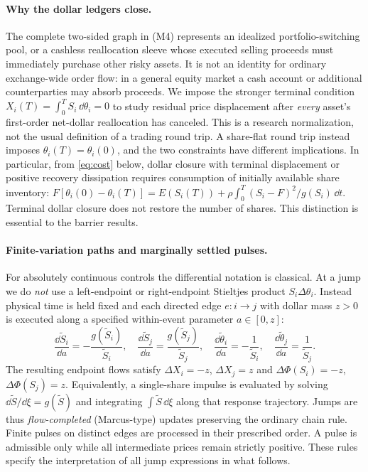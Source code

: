 \documentclass[review,hidelinks,onefignum,onetabnum]{siamonline250211}
\begin{document}
\paragraph{Why the dollar ledgers close.}
The complete two-sided graph in (M4) represents an idealized portfolio-switching pool, or a cashless reallocation sleeve whose executed selling proceeds must immediately purchase other risky assets. It is not an identity for ordinary exchange-wide order flow: in a general equity market a cash account or additional counterparties may absorb proceeds. We impose the stronger terminal condition $X_i(T)=\int_0^T S_i\,\dd\theta_i=0$ to study residual price displacement after \emph{every} asset's first-order net-dollar reallocation has canceled. This is a research normalization, not the usual definition of a trading round trip. A share-flat round trip instead imposes $\theta_i(T)=\theta_i(0)$, and the two constraints have different implications. In particular, from \eqref{eq:cost} below, dollar closure with terminal displacement or positive recovery dissipation requires consumption of initially available share inventory: $F[\theta_i(0)-\theta_i(T)]=E(S_i(T))+\rho\int_0^T(S_i-F)^2/g(S_i)\,\dd t$. Terminal dollar closure does not restore the number of shares. This distinction is essential to the barrier results.

\paragraph{Finite-variation paths and marginally settled pulses.}
For absolutely continuous controls the differential notation is classical. At a jump we do \emph{not} use a left-endpoint or right-endpoint Stieltjes product $S_i\Delta\theta_i$. Instead physical time is held fixed and each directed edge $e:i\to j$ with dollar mass $z>0$ is executed along a specified within-event parameter $a\in[0,z]$:
\begin{equation}\label{eq:pulse-flow}
\frac{\dd \widetilde S_i}{\dd a}=-\frac{g(\widetilde S_i)}{\widetilde S_i},\quad
\frac{\dd \widetilde S_j}{\dd a}=\frac{g(\widetilde S_j)}{\widetilde S_j},\quad
\frac{\dd\widetilde\theta_i}{\dd a}=-\frac{1}{\widetilde S_i},\quad
\frac{\dd\widetilde\theta_j}{\dd a}=\frac{1}{\widetilde S_j}.
\end{equation}
The resulting endpoint flows satisfy $\Delta X_i=-z$, $\Delta X_j=z$ and $\Delta\Phi(S_i)=-z$, $\Delta\Phi(S_j)=z$. Equivalently, a single-share impulse is evaluated by solving $\dd\widetilde S/\dd\xi=g(\widetilde S)$ and integrating $\int\widetilde S\,\dd\xi$ along that response trajectory. Jumps are thus \emph{flow-completed} (Marcus-type) updates preserving the ordinary chain rule. Finite pulses on distinct edges are processed in their prescribed order. A pulse is admissible only while all intermediate prices remain strictly positive. These rules specify the interpretation of all jump expressions in what follows.
\end{document}
